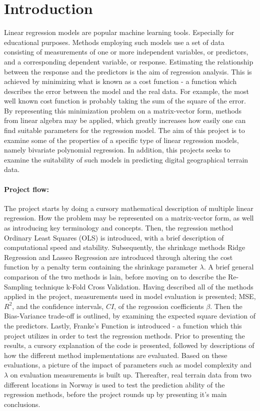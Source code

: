 \documentclass[%
oneside,                 %
final,                   %
10pt]{article}
\begin{document}
\section{Introduction}
Linear regression models are popular machine learning tools. Especially for educational purposes. Methods employing such models use a set of data consisting of measurements of one or more independent variables, or predictors, and a corresponding dependent variable, or response. Estimating the relationship between the response and the predictors is the aim of regression analysis. This is achieved by minimizing what is known as a cost function - a function which describes the error between the model and the real data. For example, the most well known cost function is probably taking the sum of the square of the error. By representing this minimization problem on a matrix-vector form, methods from linear algebra may be applied, which greatly increases how easily one can find suitable  parameters for the regression model.%
The aim of this project is to examine some of the properties of a specific type of linear regression models, namely bivariate polynomial regression. In addition, this projects seeks to examine the suitability of such models in predicting digital geographical terrain data.
\paragraph{Project flow:}
The project starts by doing a cursory mathematical description of multiple linear regression. How the problem may be represented on a matrix-vector form, as well as introducing key terminology and concepts. Then, the regression method Ordinary Least Squares (OLS) is introduced, with a brief description of computational speed and stability. Subsequently, the shrinkage methods Ridge Regression and Lasseo Regression are introduced through altering the cost function by a penalty term containing the shrinkage parameter $\lambda$. A brief general comparison of the two methods is lain, before moving on to describe the Re-Sampling technique k-Fold Cross Validation. Having described all of the methods applied in the project, measurements used in model evaluation is presented; MSE, $R^2$, and the confidence intervals, $CI$, of the regression coefficients $\beta$. Then the Bias-Variance trade-off is outlined, by examining the expected square deviation of the predictors. Lastly, Franke's Function is introduced - a function which this project utilizes in order to test the regression methods. Prior to presenting the results, a cursory explanation of the code is presented, followed by descriptions of how the different method implementations are evaluated. Based on these evaluations, a picture of the impact of parameters such as model complexity and $\lambda$ on evaluation measurements is built up. Thereafter, real terrain data from two different locations in Norway is used to test the prediction ability of the regression methods, before the project rounds up by presenting it's main conclusions.
\end{document}
